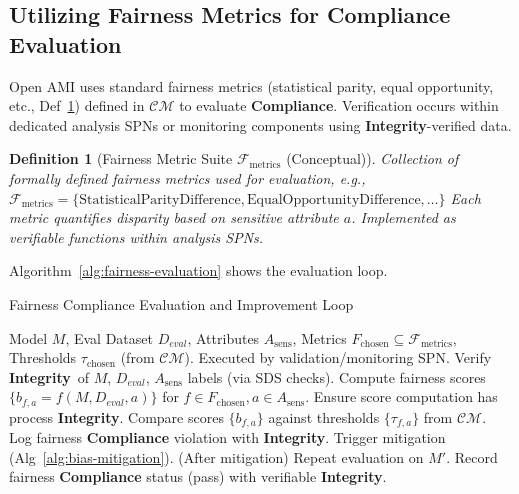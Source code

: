 \documentclass[12pt,a4paper]{report}
\newtheorem{definition}{Definition}[section]
\newcommand{\Integrity}{\textbf{Integrity}}
\begin{document}
	\subsection{Utilizing Fairness Metrics for Compliance Evaluation} %
	\label{sec:5-4-4} %
	
	Open AMI uses standard fairness metrics (statistical parity, equal opportunity, etc., Def~\ref{def:fairness_suite}) defined in $\mathcal{CM}$ to evaluate \textbf{Compliance}. Verification occurs within dedicated analysis SPNs or monitoring components using \Integrity-verified data.
	
	\begin{definition}[Fairness Metric Suite $\mathcal{F}_{\text{metrics}}$ (Conceptual)]
		\label{def:fairness_suite}
		Collection of formally defined fairness metrics used for evaluation, e.g.,
		$\mathcal{F}_{\text{metrics}} = \{ \text{StatisticalParityDifference}, \text{EqualOpportunityDifference}, \dots \}$
		Each metric quantifies disparity based on sensitive attribute $a$. Implemented as verifiable functions within analysis SPNs.
	\end{definition}
	
	Algorithm~\ref{alg:fairness-evaluation} shows the evaluation loop.
	
	\begin{algorithm}[H]
		\caption{Fairness Compliance Evaluation and Improvement Loop}
		\label{alg:fairness-evaluation}
		\begin{algorithmic}[1]
			\Require Model $M$, Eval Dataset $D_{eval}$, Attributes $A_{\text{sens}}$, Metrics $F_{\text{chosen}} \subseteq \mathcal{F}_{\text{metrics}}$, Thresholds $\tau_{\text{chosen}}$ (from $\mathcal{CM}$). Executed by validation/monitoring SPN.
			\State Verify \Integrity\ of $M$, $D_{eval}$, $A_{\text{sens}}$ labels (via SDS checks).
			\State Compute fairness scores $\{b_{f,a} = f(M, D_{eval}, a)\}$ for $f \in F_{\text{chosen}}, a \in A_{\text{sens}}$. Ensure score computation has process \Integrity.
			\State Compare scores $\{b_{f,a}\}$ against thresholds $\{\tau_{f,a}\}$ from $\mathcal{CM}$.
			\State Log fairness \textbf{Compliance} violation with \Integrity.
			\State Trigger mitigation (Alg~\ref{alg:bias-mitigation}).
			\State (After mitigation) Repeat evaluation on $M'$.
			\Else
			\State Record fairness \textbf{Compliance} status (pass) with verifiable \Integrity.
			\EndIf
		\end{algorithmic}
	\end{algorithm}
	
\end{document}
